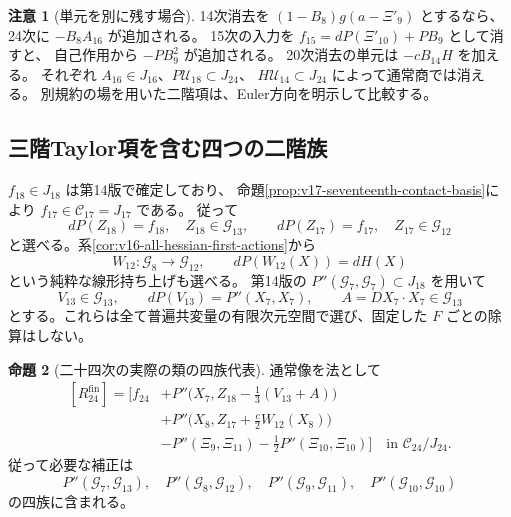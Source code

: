\documentclass[a4paper,11pt]{ltjsarticle}
\theoremstyle{definition}
\newtheorem{theorem}{命題}[section]
\newtheorem{remark}[theorem]{注意}
\begin{document}
\begin{remark}[単元を別に残す場合]
14次消去を $(1-B_8)g(a-\Xi'_9)$ とするなら、
24次に $-B_8A_{16}$ が追加される。
15次の入力を $f_{15}=dP(\Xi'_{10})+PB_9$ として消すと、
自己作用から $-PB_9^2$ が追加される。
20次消去の単元は $-cB_{14}H$ を加える。
それぞれ $A_{16}\in J_{16}$、$P\mathcal U_{18}\subset J_{24}$、
$H\mathcal U_{14}\subset J_{24}$ によって通常商では消える。
別規約の場を用いた二階項は、Euler方向を明示して比較する。
\end{remark}

\subsection{三階Taylor項を含む四つの二階族}

$f_{18}\in J_{18}$ は第14版で確定しており、
命題\ref{prop:v17-seventeenth-contact-basis}により
$f_{17}\in\mathcal C_{17}=J_{17}$ である。
従って
\[
 dP(Z_{18})=f_{18},\quad Z_{18}\in\mathcal G_{13},\qquad
 dP(Z_{17})=f_{17},\quad Z_{17}\in\mathcal G_{12}
\]
と選べる。系\ref{cor:v16-all-hessian-first-actions}から
\[
 W_{12}:\mathcal G_8\longrightarrow\mathcal G_{12},\qquad
                       dP(W_{12}(X))=dH(X)
\]
という純粋な線形持ち上げも選べる。
第14版の $P''(\mathcal G_7,\mathcal G_7)\subset J_{18}$ を用いて
\[
 V_{13}\in\mathcal G_{13},\qquad dP(V_{13})=P''(X_7,X_7),
 \qquad A=DX_7\cdot X_7\in\mathcal G_{13}
\]
とする。これらは全て普遍共変量の有限次元空間で選び、固定した $F$ ごとの除算はしない。

\begin{theorem}[二十四次の実際の類の四族代表]
\label{thm:v17-four-family-twenty-fourth-representative}
通常像を法として
\begin{equation}\label{eq:v17-four-family-twenty-fourth}
\begin{split}
 [R_{24}^{\mathrm{fin}}]=\bigl[f_{24}
 &+P''\bigl(X_7,Z_{18}-\tfrac13(V_{13}+A)\bigr)\\
 &+P''\bigl(X_8,Z_{17}+\tfrac c2W_{12}(X_8)\bigr)\\
 &-P''(\Xi_9,\Xi_{11})-\tfrac12P''(\Xi_{10},\Xi_{10})\bigr]
 \quad\text{in }\mathcal C_{24}/J_{24}.
\end{split}
\end{equation}
従って必要な補正は
\begin{equation}\label{eq:v17-four-pairing-families}
 P''(\mathcal G_7,\mathcal G_{13}),\quad
 P''(\mathcal G_8,\mathcal G_{12}),\quad
 P''(\mathcal G_9,\mathcal G_{11}),\quad
 P''(\mathcal G_{10},\mathcal G_{10})
\end{equation}
の四族に含まれる。
\end{theorem}
\end{document}

